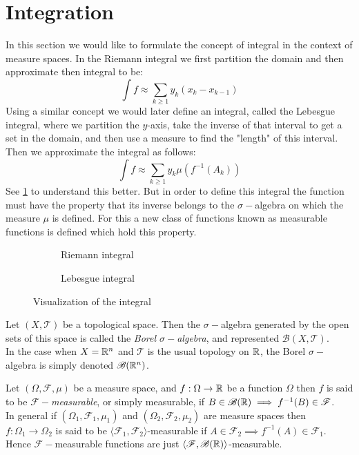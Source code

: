 \section{Integration}
In this section we would like to formulate the concept of integral in the context of measure spaces. In the Riemann integral we first partition the domain and then approximate then integral to be:
\[\int f \approx \sum_{k\geq 1} y_k (x_k - x_{k-1})\]
Using a similar concept we would later define an integral, called the Lebesgue integral, where we partition the $y$-axis, take the inverse of that interval to get a set in the domain, and then use a measure to find the "length" of this interval. Then we approximate the integral as follows:
\[\int f \approx \sum_{k\geq 1} y_k \mu(f^{-1}(A_k))\]
See \cref{fig:int} to understand this better. But in order to define this integral the function must have the property that its inverse belongs to the $\sigma-$algebra on which the measure $\mu$ is defined. For this a new class of functions known as measurable functions is defined which hold this property. 
\begin{figure}
  \centering
  \begin{subfigure}[b]{0.45\textwidth}
    \caption{Riemann integral}
  \end{subfigure}
  \hfill
  \begin{subfigure}[b]{0.45\textwidth}
    \caption{Lebesgue integral}
  \end{subfigure}
  \caption{Visualization of the integral}
  \label{fig:int}
\end{figure}
\begin{definition}
  Let $(X,\mathscr{T})$ be a topological space. Then the $\sigma-$algebra generated by the open sets of this space is called the \textit{Borel $\sigma-$algebra}, and represented $ \mathscr{B}(X,\mathscr{T})$.\\

  In the case when $X=\mathbb{R}^n$ and $\mathscr{T}$ is the usual topology on $\mathbb{R}$, the Borel $\sigma-$algebra is simply denoted $ \mathscr{B}( \mathbb{R}^n)$.
\end{definition}
\begin{definition}
  Let $(\Omega, \mathscr{F}, \mu)$ be a measure space, and $f:\Omega \to \mathbb{R}$ be a function $\Omega$ then $f$ is said to be $ \mathscr{F}-$\textit{measurable}, or simply measurable, if $B\in \mathscr{B}( \mathbb{R}) \implies f^{-1}(B)\in \mathscr{F}$.\\

  In general if $(\Omega_1, \mathscr{F}_1, \mu_1)$ and $(\Omega_2, \mathscr{F}_2, \mu_2)$ are measure spaces then $f: \Omega_1 \to \Omega_2$ is said to be $ \langle\mathscr{F}_1, \mathscr{F}_2 \rangle$-measurable if $A\in \mathscr{F}_2 \implies f^{-1}(A) \in \mathscr{F}_1$. Hence $ \mathscr{F}-$measurable functions are just $\langle \mathscr{F}, \mathscr{B}( \mathbb{R})\rangle$-measurable.
\end{definition}
